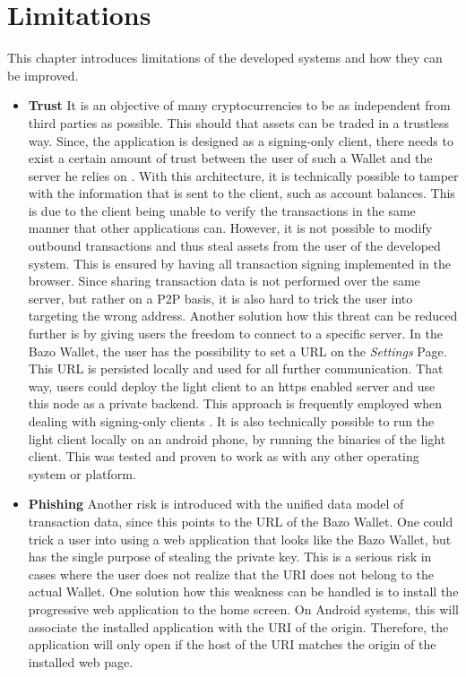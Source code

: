 \section{Limitations}\label{limitations}
This chapter introduces limitations of the developed systems and how they can be improved.
\begin{itemize}
\item \textbf{Trust} 
It is an objective of many cryptocurrencies to be as independent from third parties as possible. This should that assets can be traded in a trustless way. Since, the application is designed as a signing-only client, there needs to exist a certain amount of trust between the user of such a Wallet and the server he relies on \cite{bitcoinclients}. With this architecture, it is technically possible to tamper with the information that is sent to the client, such as account balances. This is due to the client being unable to verify the transactions in the same manner that other applications can. However, it is not possible to modify outbound transactions and thus steal assets from the user of the developed system.
This is ensured by having all transaction signing implemented in the browser. Since sharing transaction data is not performed over the same server, but rather on a P2P basis, it is also hard to trick the user into targeting the wrong address.
Another solution how this threat can be reduced further is by giving users the freedom to connect to a specific server. In the Bazo Wallet, the user has the possibility to set a URL on the \textit{Settings} Page. This URL is persisted locally and used for all further communication. That way, users could deploy the light client to an https enabled server and use this node as a private backend. This approach is frequently employed when dealing with signing-only clients \cite{bitcoinclients}. It is also technically possible to run the light client locally on an android phone, by running the binaries of the light client. This was tested and proven to work as with any other operating system or platform.
\item \textbf{Phishing} 
Another risk is introduced with the unified data model of transaction data, since this points to the URL of the Bazo Wallet. One could trick a user into using a web application that looks like the Bazo Wallet, but has the single purpose of stealing the private key. This is a serious risk in cases where the user does not realize that the URI does not belong to the actual Wallet.
One solution how this weakness can be handled is to install the progressive web application to the home screen. On Android systems, this will associate the installed application with the URI of the origin. Therefore, the application will only open if the host of the URI matches the origin of the installed web page.

\end{itemize}
